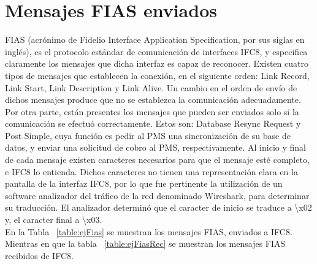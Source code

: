 \section{Mensajes FIAS enviados}
		FIAS (acrónimo de Fidelio Interface Application Specification, por sus siglas en inglés), es el protocolo estándar de comunicación de interfaces IFC8, y especifica claramente los mensajes que dicha interfaz es capaz de reconocer. Existen cuatro tipos de mensajes que establecen la conexión, en el siguiente orden: Link Record, Link Start, Link Description y Link Alive. Un cambio en el orden de envío de dichos mensajes produce que no se establezca la comunicación adecuadamente. Por otra parte, están presentes los mensajes que pueden ser enviados solo si la comunicación se efectuó correctamente. Estos son: Database Resync Request y Post Simple, cuya función es pedir al PMS una sincronización de su base de datos, y enviar una solicitud de cobro al PMS, respectivamente.
\newline
\newline		
\indent Al inicio y final de cada mensaje existen caracteres necesarios para que el mensaje esté completo, e IFC8 lo entienda. Dichos caracteres no tienen una representación clara en la pantalla de la interfaz IFC8, por lo que fue pertinente la utilización de un software analizador del tráfico de la red denominado Wireshark, para determinar su traducción. El analizador determinó que el  caracter de inicio se traduce a \textbackslash x02 y, el caracter final a \textbackslash x03. 
\\
\newline
\indent En la Tabla ~\ref{table:ejFias} se muestran los mensajes FIAS, enviados a IFC8. Mientras en que la tabla  ~\ref{table:ejFiasRec} se muestran los mensajes FIAS recibidos de IFC8.


